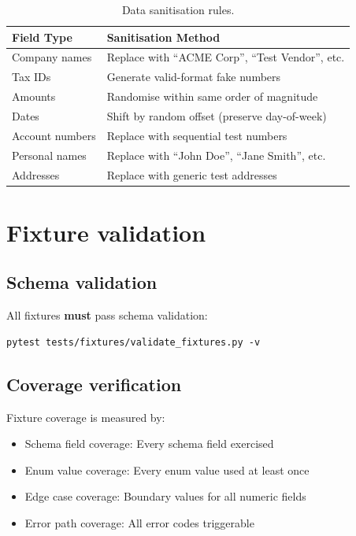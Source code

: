 \begin{table}[htbp]
\centering
\caption{Data sanitisation rules.}
\label{tab:sanitisation}
\footnotesize
\begin{tabularx}{\linewidth}{@{}l X@{}}
\toprule
\textbf{Field Type} & \textbf{Sanitisation Method} \\ \midrule
Company names & Replace with ``ACME Corp'', ``Test Vendor'', etc. \\
Tax IDs & Generate valid-format fake numbers \\
Amounts & Randomise within same order of magnitude \\
Dates & Shift by random offset (preserve day-of-week) \\
Account numbers & Replace with sequential test numbers \\
Personal names & Replace with ``John Doe'', ``Jane Smith'', etc. \\
Addresses & Replace with generic test addresses \\
\bottomrule
\end{tabularx}
\end{table}

\section{Fixture validation}

\subsection{Schema validation}

All fixtures \textbf{must} pass schema validation:

\begin{lstlisting}[basicstyle=\ttfamily\small]
pytest tests/fixtures/validate_fixtures.py -v
\end{lstlisting}

\subsection{Coverage verification}

Fixture coverage is measured by:
\begin{itemize}
  \item Schema field coverage: Every schema field exercised
  \item Enum value coverage: Every enum value used at least once
  \item Edge case coverage: Boundary values for all numeric fields
  \item Error path coverage: All error codes triggerable
\end{itemize}

